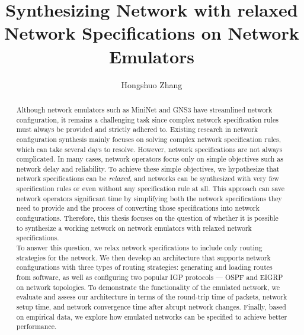 \documentclass{uiucthesis2021}
\begin{document}
\title{Synthesizing Network with relaxed Network Specifications on Network Emulators}
\author{Hongshuo Zhang}
\concentration{}
\maketitle
\frontmatter

\begin{abstract}

\noindent Although network emulators such as MiniNet and GNS3 have streamlined network configuration, it remains a challenging task since complex network specification rules must always be provided and strictly adhered to. Existing research in network configuration synthesis mainly focuses on solving complex network specification rules, which can take several days to resolve. However, network specifications are not always complicated. In many cases, network operators focus only on simple objectives such as network delay and reliability. To achieve these simple objectives, we hypothesize that network specifications can be \textit{relaxed}, and networks can be synthesized with very few specification rules or even without any specification rule at all. This approach can save network operators significant time by simplifying both the network specifications they need to provide and the process of converting those specifications into network configurations. Therefore, this thesis focuses on the question of whether it is possible to synthesize a working network on network emulators with relaxed network specifications. \\

\noindent To answer this question, we relax network specifications to include only routing strategies for the network. We then develop an architecture that supports network configurations with three types of routing strategies: generating and loading routes from software, as well as configuring two popular IGP protocols --- OSPF and EIGRP on network topologies. To demonstrate the functionality of the emulated network, we evaluate and assess our architecture in terms of the round-trip time of packets, network setup time, and network convergence time after abrupt network changes. Finally, based on empirical data, we explore how emulated networks can be specified to achieve better performance.\\


\end{abstract}
\end{document}
